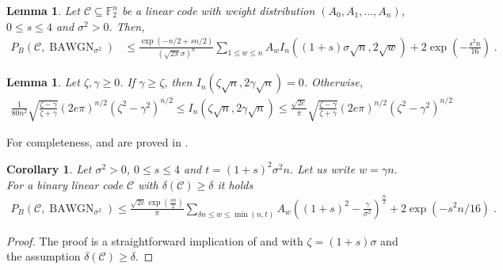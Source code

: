 \documentclass{article}
\DeclareMathOperator{\BAWGN}{BAWGN}
\newcommand{\cC}{\mathcal{C}}
\theoremstyle{plain}
\theoremstyle{plain}
\theoremstyle{plain}
\theoremstyle{plain}
\theoremstyle{plain}
\theoremstyle{plain}
\theoremstyle{plain}
\newtheorem{lemma}[definition]{Lemma}%
\theoremstyle{plain}
\newtheorem{corollary}[definition]{Corollary}%
\theoremstyle{plain}
\theoremstyle{plain}
\theoremstyle{remark}
\theoremstyle{remark}
\theoremstyle{remark}
\theoremstyle{plain}
\begin{document}
\begin{lemma}
\label{lem:sphere_bound}
Let $\mathcal{C}\subseteq\mathbb{F}_2^n$ be a linear code with
weight distribution
$(A_0,A_1,\ldots,A_n)$,
$0\le s\le 4$
and $\sigma^2>0$. Then,
\begin{align*}
P_{B}(\mathcal{C},\BAWGN_{\sigma^2})
&\le
\frac{\exp(-n/2+sn/2)}
{\left(\sqrt{2\pi}\sigma\right)^n}
\sum_{1\le w\le n}A_w
I_n\left((1+s)\sigma\sqrt{n},2\sqrt{w}\right)
+2\exp\left(-\frac{s^2n}{16}\right)\;.
\end{align*}
\end{lemma}

\begin{lemma}
\label{lem: Gaussian_ball_intersection}
Let $\zeta,\gamma\ge 0$.
If $\gamma\ge \zeta$, then
$I_n(\zeta\sqrt{n},2\gamma\sqrt{n})=0$. Otherwise,
\begin{align*}
\frac{1}{80n^2}\sqrt{\frac{\zeta-\gamma}{\zeta+\gamma}}
\left(2e\pi\right)^{n/2}(\zeta^2-\gamma^2)^{n/2}
\le I_n(\zeta\sqrt{n},2\gamma\sqrt{n})
\le\frac{\sqrt{2e}}{\pi}\sqrt{\frac{\zeta-\gamma}{\zeta+\gamma}}\left(2e\pi\right)^{n/2}(\zeta^2-\gamma^2)^{n/2}
\end{align*}
\end{lemma}
For completeness,  
and  are proved
in .


\begin{corollary}
\label{cor:Gaussian_error_prob}
    Let $\sigma^2> 0$, $0\le s\le 4$ and $t=(1+s)^2\sigma^2n$. Let us write $w=\gamma n$.
    For a binary linear code $\cC$ with $\delta(\cC)\ge\delta$ it holds
    \begin{align*}
        P_B(\cC, \BAWGN_{\sigma^2})\le \frac{\sqrt{2e}\exp(\frac{sn}{2})}{\pi}\sum_{\delta n\le w\le \min(n,t)}A_{w}\left((1+s)^2-\frac{\gamma}{\sigma^2}\right)^{\frac{n}{2}}+2\exp(-s^2n/16) \;.
    \end{align*}
\end{corollary}
\begin{proof}
    The proof is a straightforward implication of  and  with $\zeta=(1+s)\sigma$ and the assumption $\delta(\cC)\ge\delta$.
\end{proof}
\end{document}

